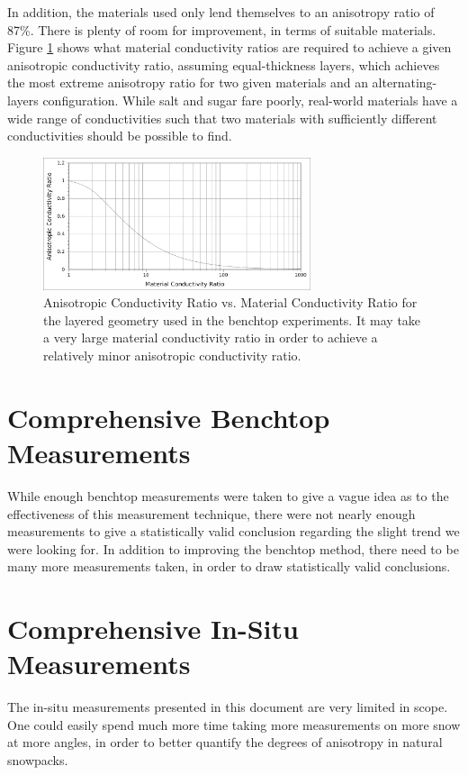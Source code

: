 In addition, the materials used only lend themselves to an anisotropy ratio of
87\%. There is plenty of room for improvement, in terms of suitable materials.
Figure \ref{fig:anisovmatl_rats} shows what material conductivity ratios are
required to achieve a given anisotropic conductivity ratio, assuming
equal-thickness layers, which achieves the most extreme anisotropy ratio for
two given materials and an alternating-layers configuration. While salt and
sugar fare poorly, real-world materials have a wide range of conductivities
such that two materials with sufficiently different conductivities should be
possible to find.

\begin{figure}[h]
\centering
\includegraphics[width=0.7\textwidth]{fig/anisovmaterial_ratios.png}
\caption{Anisotropic Conductivity Ratio vs. Material Conductivity Ratio for the
layered geometry used in the benchtop experiments. It may take a very large
material conductivity ratio in order to achieve a relatively minor anisotropic
conductivity ratio.}
\label{fig:anisovmatl_rats}
\end{figure}

\section{Comprehensive Benchtop Measurements}

While enough benchtop measurements were taken to give a vague idea as to the
effectiveness of this measurement technique, there were not nearly enough
measurements to give a statistically valid conclusion regarding the slight
trend we were looking for. In addition to improving the benchtop method, there
need to be many more measurements taken, in order to draw statistically valid
conclusions.

\section{Comprehensive In-Situ Measurements}

The in-situ measurements presented in this document are very limited in scope.
One could easily spend much more time taking more measurements on more snow at
more angles, in order to better quantify the degrees of anisotropy in natural
snowpacks.

